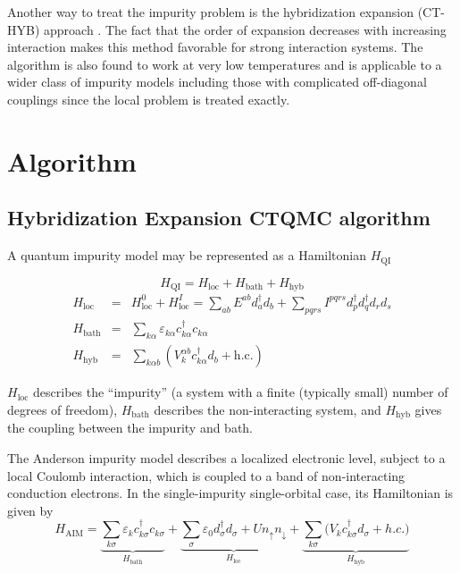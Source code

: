 Another way to treat the impurity problem is the hybridization expansion (CT-HYB)
approach \cite{RevModPhys.83.349, PhysRevB.75.155113, PhysRevB.80.235117,
PhysRevB.74.155107}. 
The fact that the order of expansion decreases with increasing 
interaction makes this method favorable for strong interaction systems. 
The algorithm is also found to work at very low temperatures and is applicable
to a wider class of impurity models including those with complicated 
off-diagonal couplings since the local problem is treated exactly. 

\section{Algorithm}
\label{sec:hyb-alg}
\subsection{Hybridization Expansion CTQMC algorithm}
A quantum impurity model may be represented as a Hamiltonian $H_\text{QI}$

\begin{equation}
H_\text{QI}=H_\text{loc}+H_\text{bath}+H_\text{hyb}
\end{equation}
\begin{eqnarray}
H_\text{loc}&=& H_\text{loc}^0+H_\text{loc}^I=
                \sum_{ab} E^{ab}d^\dagger_a d_b + 
                \sum_{pqrs}I^{pqrs}d^\dagger_p d^\dagger_q d_r d_s \\
H_\text{bath}&=&\sum_{k\alpha} 
                 \varepsilon_{k\alpha}c^\dagger_{k\alpha}c_{k\alpha} \\
H_\text{hyb}&=&\sum_{k\alpha b} ({V}_k^{\alpha b}c^\dagger_{k\alpha}d_b 
                +\text{h.c.})
\end{eqnarray}

$H_\text{loc}$ describes the ``impurity'' (a system
with a finite (typically small) number of degrees of freedom), 
$H_\text{bath}$ describes the non-interacting system, 
and $H_\text{hyb}$ gives the coupling between the impurity and bath.

The Anderson impurity model describes a localized electronic level, subject to 
a local Coulomb interaction, which is coupled to a band of non-interacting 
conduction electrons. In the  single-impurity single-orbital case, its 
Hamiltonian is given by
\begin{equation}
H_\text{AIM}= \underbrace{\sum_{k\sigma}
  \varepsilon_k c^\dagger_{k\sigma}c_{k\sigma}}_{H_\text{bath}} 
+  \underbrace{\sum_\sigma \varepsilon_0d^\dagger_\sigma d_\sigma 
  + Un_\uparrow n_\downarrow}_{H_\text{loc}}
+ \underbrace{\sum_{k\sigma}\Big(V_kc^\dagger_{k\sigma}d_\sigma+h.c.\Big)}
_{H_\text{hyb}}
\end{equation}



